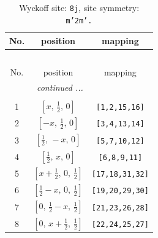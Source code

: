 \documentclass[fleqn,8pt]{jsarticle}
\begin{document}
\begin{longtable}{ccc}
\caption{Wyckoff site: {\tt 8j}, site symmetry: {\tt m'2m'.}}
 \\
 \hline \hline
No. & position & mapping \\ \hline \endfirsthead

\multicolumn{2}{l}{\tablename\ \thetable{}} \\
 \hline \hline
No. & position & mapping \\ \hline \endhead

 \hline \hline
\multicolumn{2}{r}{\footnotesize\it continued ...} \\ \endfoot

 \hline \hline
\multicolumn{2}{r}{} \\ \endlastfoot

1 & $\left[ x,\, \frac{1}{2},\, 0 \right]$ & {\tt [1,2,15,16]} \\ \hline
2 & $\left[ - x,\, \frac{1}{2},\, 0 \right]$ & {\tt [3,4,13,14]} \\ \hline
3 & $\left[ \frac{1}{2},\, - x,\, 0 \right]$ & {\tt [5,7,10,12]} \\ \hline
4 & $\left[ \frac{1}{2},\, x,\, 0 \right]$ & {\tt [6,8,9,11]} \\ \hline
5 & $\left[ x + \frac{1}{2},\, 0,\, \frac{1}{2} \right]$ & {\tt [17,18,31,32]} \\ \hline
6 & $\left[ \frac{1}{2} - x,\, 0,\, \frac{1}{2} \right]$ & {\tt [19,20,29,30]} \\ \hline
7 & $\left[ 0,\, \frac{1}{2} - x,\, \frac{1}{2} \right]$ & {\tt [21,23,26,28]} \\ \hline
8 & $\left[ 0,\, x + \frac{1}{2},\, \frac{1}{2} \right]$ & {\tt [22,24,25,27]} \\
\end{longtable}
\renewcommand{\arraystretch}{1.2}
\end{document}
